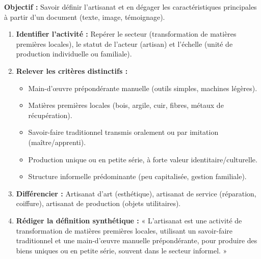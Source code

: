\documentclass[11pt]{article}
\newcommand{\cle}[1]{{\popxbold\color{popdark}#1}}
\begin{document}
\begin{methode}
\textbf{Objectif :} Savoir définir l'artisanat et en dégager les caractéristiques principales à partir d'un document (texte, image, témoignage).
\begin{enumerate}
    \item \textbf{Identifier l'activité :} Repérer le secteur (transformation de matières premières locales), le statut de l'acteur (artisan) et l'échelle (unité de production individuelle ou familiale).
    \item \textbf{Relever les critères distinctifs :} 
    \begin{itemize}
        \item Main-d'œuvre \cle{prépondérante manuelle} (outils simples, machines légères).
        \item Matières premières \cle{locales} (bois, argile, cuir, fibres, métaux de récupération).
        \item \cle{Savoir-faire traditionnel} transmis oralement ou par imitation (maître/apprenti).
        \item Production \cle{unique ou en petite série}, à forte valeur identitaire/culturelle.
        \item Structure \cle{informelle} prédominante (peu capitalisée, gestion familiale).
    \end{itemize}
    \item \textbf{Différencier :} Artisanat d'art (esthétique), artisanat de service (réparation, coiffure), artisanat de production (objets utilitaires).
    \item \textbf{Rédiger la définition synthétique :} « L'artisanat est une activité de transformation de matières premières locales, utilisant un savoir-faire traditionnel et une main-d'œuvre manuelle prépondérante, pour produire des biens uniques ou en petite série, souvent dans le secteur informel. »
\end{enumerate}
\end{methode}
\end{document}
